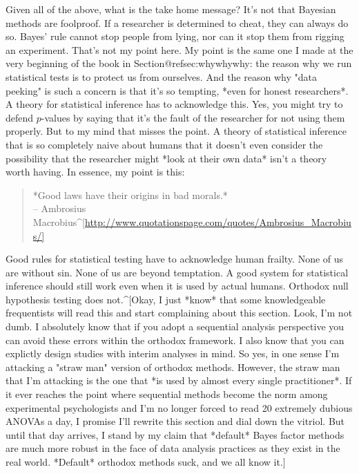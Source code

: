 Given all of the above, what is the take home message? It's not that Bayesian methods are foolproof. If a researcher is determined to cheat, they can always do so. Bayes' rule cannot stop people from lying, nor can it stop them from rigging an experiment. That's not my point here. My point is the same one I made at the very beginning of the book in Section@refsec:whywhywhy: the reason why we run statistical tests is to protect us from ourselves. And the reason why "data peeking" is such a concern is that it's so tempting, *even for honest researchers*. A theory for statistical inference has to acknowledge this. Yes, you might try to defend $p$-values by saying that it's the fault of the researcher for not using them properly. But to my mind that misses the point. A theory of statistical inference that is so completely naive about humans that it doesn't even consider the possibility that the researcher might *look at their own data* isn't a theory worth having. In essence, my point is this:


\begin{quote}
*Good laws have their origins in bad morals.*\\
\hspace*{2cm} -- Ambrosius Macrobius^[\url{http://www.quotationspage.com/quotes/Ambrosius_Macrobius/]}
\end{quote}



Good rules for statistical testing have to acknowledge human frailty. None of us are without sin. None of us are beyond temptation. A good system for statistical inference should still work even when it is used by actual humans. Orthodox null hypothesis testing does not.^[Okay, I just *know* that some knowledgeable frequentists will read this and start complaining about this section. Look, I'm not dumb. I absolutely know that if you adopt a sequential analysis perspective you can avoid these errors within the orthodox framework. I also know that you can explictly design studies with interim analyses in mind. So yes, in one sense I'm attacking a "straw man" version of orthodox methods. However, the straw man that I'm attacking is the one that *is used by almost every single practitioner*. If it ever reaches the point where sequential methods become the norm among experimental psychologists and I'm no longer forced to read 20 extremely dubious ANOVAs a day, I promise I'll rewrite this section and dial down the vitriol. But until that day arrives, I stand by my claim that *default* Bayes factor methods are much more robust in the face of data analysis practices as they exist in the real world. *Default* orthodox methods suck, and we all know it.] 




